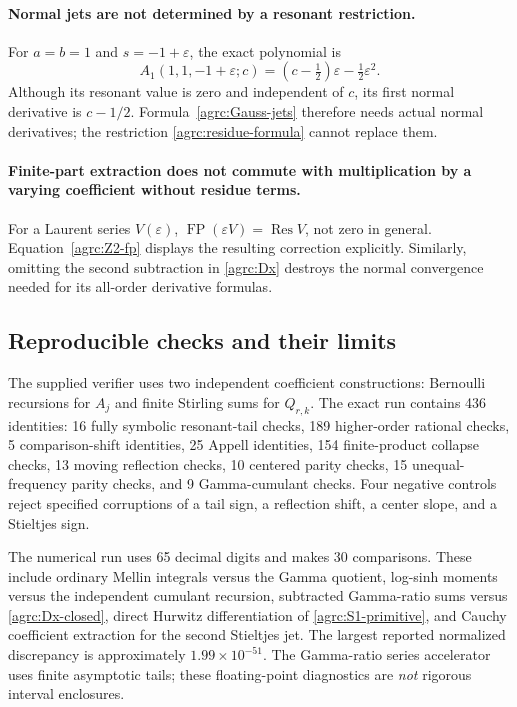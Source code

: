 \documentclass[11pt]{article}
\numberwithin{equation}{section}
\theoremstyle{definition}\newtheorem{definition}[theorem]{Definition}
\theoremstyle{remark}\newtheorem{remark}[theorem]{Remark}
\newcommand{\FP}{\operatorname{FP}}
\newcommand{\Res}{\operatorname{Res}}
\begin{document}
\paragraph{Normal jets are not determined by a resonant restriction.}
For $a=b=1$ and $s=-1+\varepsilon$, the exact polynomial is
\begin{equation}\label{agrc:normal-counterexample}
 A_1(1,1,-1+\varepsilon;c)
          =(c-\tfrac12)\varepsilon-\tfrac12\varepsilon^2.
\end{equation}
Although its resonant value is zero and independent of $c$, its first
normal derivative is $c-1/2$. Formula~\eqref{agrc:Gauss-jets} therefore
needs actual normal derivatives; the restriction
\eqref{agrc:residue-formula} cannot replace them.

\paragraph{Finite-part extraction does not commute with multiplication
by a varying coefficient without residue terms.}
For a Laurent series $V(\varepsilon)$,
$\FP(\varepsilon V)=\Res V$, not zero in general.
Equation~\eqref{agrc:Z2-fp} displays the resulting correction explicitly.
Similarly, omitting the second subtraction in \eqref{agrc:Dx} destroys
the normal convergence needed for its all-order derivative formulas.

\subsection{Reproducible checks and their limits}

The supplied verifier uses two independent coefficient constructions:
Bernoulli recursions for $A_j$ and finite Stirling sums for $Q_{r,k}$.
The exact run contains 436 identities: 16 fully symbolic resonant-tail
checks, 189 higher-order rational checks, 5 comparison-shift identities,
25 Appell identities, 154 finite-product collapse checks, 13 moving
reflection checks, 10 centered parity checks, 15 unequal-frequency
parity checks, and 9 Gamma-cumulant checks. Four negative controls reject
specified corruptions of a tail sign, a reflection shift, a center slope,
and a Stieltjes sign.

The numerical run uses 65 decimal digits and makes 30 comparisons.
These include ordinary Mellin integrals versus the Gamma quotient,
log-sinh moments versus the independent cumulant recursion,
subtracted Gamma-ratio sums versus \eqref{agrc:Dx-closed}, direct
Hurwitz differentiation of \eqref{agrc:S1-primitive}, and Cauchy
coefficient extraction for the second Stieltjes jet. The largest
reported normalized discrepancy is approximately $1.99\times10^{-51}$.
The Gamma-ratio series accelerator uses finite asymptotic tails; these
floating-point diagnostics are \emph{not} rigorous interval enclosures.
\end{document}
